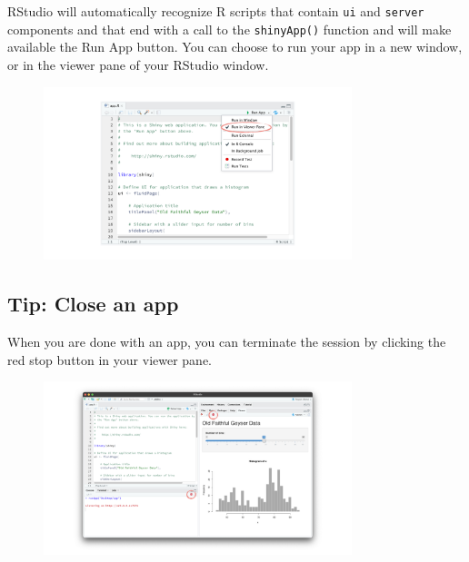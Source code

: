 \documentclass[
  letterpaper,
  DIV=11,
  numbers=noendperiod]{scrreprt}
\begin{document}
RStudio will automatically recognize R scripts that contain \texttt{ui}
and \texttt{server} components and that end with a call to the
\texttt{shinyApp()} function and will make available the Run App button.
You can choose to run your app in a new window, or in the viewer pane of
your RStudio window.

\begin{figure}

{\centering \includegraphics[width=0.8\textwidth,height=\textheight]{./images/recap-5.png}

}

\end{figure}

\hypertarget{tip-close-an-app-3}{%
\subsection{Tip: Close an app}\label{tip-close-an-app-3}}

When you are done with an app, you can terminate the session by clicking
the red stop button in your viewer pane.

\begin{figure}

{\centering \includegraphics[width=0.8\textwidth,height=\textheight]{./images/recap-6.png}

}

\end{figure}
\end{document}
